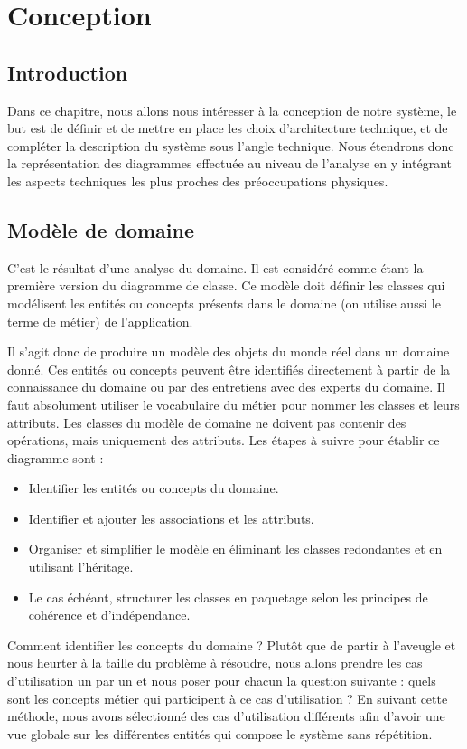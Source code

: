 \chapter{Conception}
\renewcommand{\headrulewidth}{1pt}

\section{Introduction}
Dans ce chapitre, nous allons nous intéresser à la conception de notre système, le but est de définir et de mettre en place les choix d’architecture technique, et de compléter la description du système sous l’angle technique. Nous étendrons donc la représentation des diagrammes effectuée au niveau de l’analyse en y intégrant les aspects techniques les plus proches des préoccupations physiques.

\section{Modèle de domaine}
C’est le résultat d’une analyse du domaine. Il est considéré comme étant la première version du diagramme de classe. Ce modèle doit définir les classes qui modélisent les entités ou concepts présents dans le domaine (on utilise aussi le terme de métier) de l’application.

Il s’agit donc de produire un modèle des objets du monde réel dans un domaine donné. Ces entités ou concepts peuvent être identifiés directement à partir de la connaissance du domaine ou par des entretiens avec des experts du domaine. Il faut absolument utiliser le vocabulaire du métier pour nommer les classes et leurs attributs. Les classes du modèle de domaine ne doivent pas contenir des opérations, mais uniquement des attributs\cite{7}. Les étapes à suivre pour établir ce diagramme sont :
\begin{itemize}
    \item [\textbullet] Identifier les entités ou concepts du domaine.
    \item [\textbullet] Identifier et ajouter les associations et les attributs.
    \item [\textbullet] Organiser et simplifier le modèle en éliminant les classes redondantes et en utilisant l'héritage.
    \item [\textbullet] Le cas échéant, structurer les classes en paquetage selon les principes de cohérence et d'indépendance.
\end{itemize}
Comment identifier les concepts du domaine ? Plutôt que de partir à l’aveugle et nous heurter à la taille du problème à résoudre, nous allons prendre les cas d’utilisation un par un et nous poser pour chacun la question suivante : quels sont les concepts métier qui participent à ce cas d’utilisation ? En suivant cette méthode, nous avons sélectionné des cas d’utilisation différents afin d’avoir une vue globale sur les différentes entités qui compose le système sans répétition.

